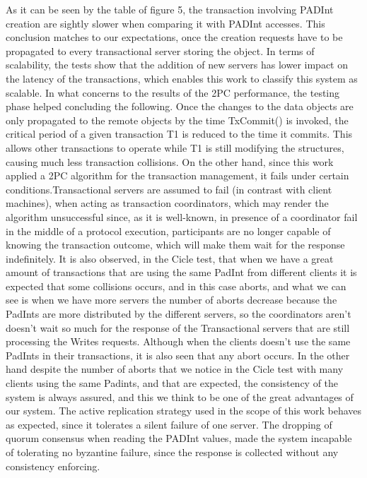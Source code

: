 \documentclass[times, 10pt,twocolumn]{article}
\begin{document}
As it can be seen by the table of figure 5, the transaction involving PADInt creation are sightly slower when comparing it with PADInt accesses. This conclusion matches to our expectations,
once the creation requests have to be propagated to every transactional server storing the object.
In terms of scalability, the tests show that the addition of new servers has lower impact on the latency of the transactions, which enables this work to classify this system as scalable.
In what concerns to the results of the 2PC performance, the testing phase helped concluding the following. Once the changes to the data objects are only propagated to the remote objects by the time TxCommit() is invoked, the critical period of a given transaction T1 is reduced to the time it commits. This allows other transactions to operate while T1 is still modifying the structures, causing much less transaction collisions. On the other hand, since this work applied a 2PC algorithm for the transaction management, it fails under certain conditions.Transactional servers are assumed to fail (in contrast with client machines), when acting as transaction coordinators, which may render the algorithm unsuccessful since, as it is well-known, in presence of a coordinator fail in the middle of a protocol execution, participants are no longer capable of knowing the transaction outcome, which will make them wait for the response indefinitely. It is also observed, in the Cicle test, that when we have a great amount of transactions that are using the same PadInt from different clients it is expected that some collisions occurs, and in this case aborts, and what we can see is when we have more servers the number of aborts decrease because the PadInts are more distributed by the different servers, so the coordinators aren't doesn't wait so much for the response of the Transactional servers that are still processing the Writes requests. Although when the clients doesn't use the same PadInts in their transactions, it is also seen that any abort occurs. In the other hand despite the number of aborts that we notice in the Cicle test with many clients using the same Padints, and that are expected, the consistency of the system is always assured, and this we think to be one of the great advantages of our system.
The active replication strategy used in the scope of this work behaves as expected, since it tolerates a silent failure of one server.
The dropping of quorum consensus when reading the PADInt values, made the system incapable of tolerating no byzantine failure, since the response is collected without any consistency enforcing.
\end{document}

